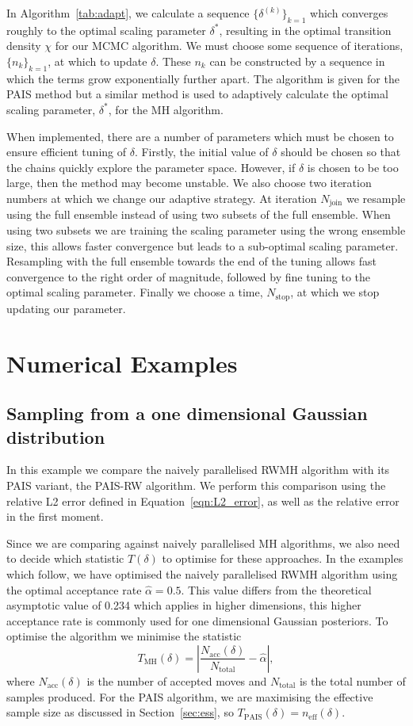 \documentclass[final]{siamltex}
\newcommand{\neff}{n_{\text{eff}}}
\begin{document}
 In Algorithm~\ref{tab:adapt}, we calculate a sequence $\{\delta^{(k)}\}_{k=1}$ which converges roughly to the optimal scaling parameter $\delta^*$, resulting in the optimal transition density $\chi$ for our MCMC algorithm. We must choose some sequence of iterations, $\{n_k\}_{k=1}$, at which to update $\delta$. These $n_k$ can be constructed by a sequence in which the terms grow exponentially further apart. The algorithm is given for the PAIS method but a similar method is used to adaptively calculate the optimal scaling parameter, $\delta^*$, for the MH algorithm.

When implemented, there are a number of parameters which must be
chosen to ensure efficient tuning of $\delta$. Firstly, the initial
value of $\delta$ should be chosen so that the chains quickly explore the parameter space. However, if $\delta$ is chosen to be too
large, then the method may become unstable. We also choose two iteration numbers at which we change our adaptive strategy. At iteration $N_\text{join}$ we resample using the full ensemble instead of using two subsets of the full ensemble. When using two subsets we are training the scaling parameter using the wrong ensemble size, this allows faster convergence but leads to a sub-optimal scaling parameter. Resampling with the full ensemble towards the end of the tuning allows fast convergence to the right order of magnitude, followed by fine tuning to the optimal scaling parameter. Finally we choose a time, $N_\text{stop}$, at which we stop updating our parameter.

\section{Numerical Examples}\label{Sec:Num}

\subsection{Sampling from a one dimensional Gaussian distribution}\label{sec:problem 1}

In this example we compare the naively parallelised RWMH algorithm with its
PAIS variant, the PAIS-RW algorithm. We perform this comparison using the relative L2 error defined in Equation~\ref{eqn:L2_error}, as well as the relative error in the first moment.


Since we are comparing against naively parallelised MH algorithms,
we also need to decide which statistic $T(\delta)$ to optimise for
these approaches. In the examples which follow, we have optimised the naively parallelised RWMH algorithm using the optimal acceptance rate $\hat{\alpha} = 0.5$. This value differs from the theoretical asymptotic value of 0.234 which applies in higher dimensions, this higher acceptance rate is commonly used for one dimensional Gaussian posteriors. To optimise the algorithm we minimise the statistic
\[
	T_{\text{MH}}(\delta) = \left| \frac{N_{\text{acc}}(\delta)}{N_{\text{total}}} - \hat{\alpha} \right|,
\]
where $N_{\text{acc}}(\delta)$ is the number of accepted moves and
$N_{\text{total}}$ is the total number of samples produced. For the
PAIS algorithm, we are maximising the effective sample size as
discussed in Section~\ref{sec:ess}, so $T_{\text{PAIS}}(\delta) =
\neff(\delta)$.
\end{document}
